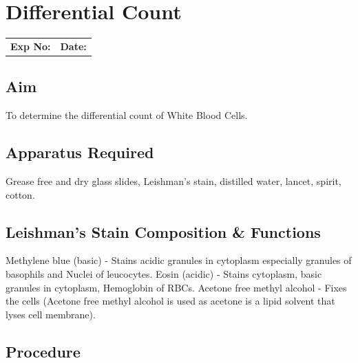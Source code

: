 \documentclass[a4paper,12pt]{book}
\begin{document}
					\chapter*{\centering Differential Count}
					\begin{tabular}{p{5in} p{1in}}
						\textbf{Exp No:}  & \textbf{Date:}\\
					\end{tabular}

					\section*{Aim}
					To determine the differential count of White Blood Cells.
					\section*{Apparatus Required}
					Grease free and dry glass slides, Leishman’s stain, distilled water, lancet, spirit, cotton.	
					\section*{Leishman's Stain Composition \& Functions}
					Methylene blue (basic) 	     -	Stains acidic granules in cytoplasm especially 						granules of basophils and Nuclei of leucocytes.\newline
					Eosin (acidic) 		     -	Stains cytoplasm, basic granules in 							cytoplasm, Hemoglobin of RBCs.\newline
					Acetone free methyl alcohol - 	Fixes the cells (Acetone free methyl alcohol 						is used as acetone is a lipid solvent that 		lyses cell membrane).\newline 

					\section*{Procedure}
\end{document}
